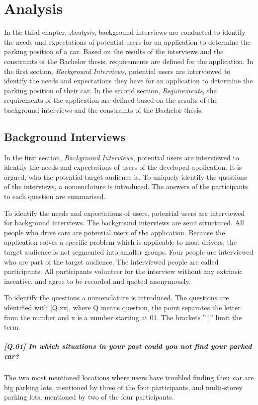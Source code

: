 \chapter{Analysis}
In the third chapter, \textit{Analysis}, background interviews are conducted to identify the needs and expectations of potential users for an application to determine the parking position of a car. Based on the results of the interviews and the constraints of the Bachelor thesis, requirements are defined for the application.
In the first section, \textit{Background Interviews}, potential users are interviewed to identify the needs and expectations they have for an application to determine the parking position of their car.
In the second section, \textit{Requirements}, the requirements of the application are defined based on the results of the background interviews and the constraints of the Bachelor thesis.

\section{Background Interviews}
In the first section, \textit{Background Interviews}, potential users are interviewed to identify the needs and expectations of  users of the developed application. It is argued, who the potential target audience is. To uniquely identify the questions of the interviews, a nomenclature is introduced. The answers of the participants to each question are summarised.

To identify the needs and expectations of users, potential users are interviewed for background interviews. The background interviews are semi structured. All people who drive cars are potential users of the application. Because the application solves a specific problem which is applicable to most drivers, the target audience is not segmented into smaller groups. Four people are interviewed who are part of the target audience. The interviewed people are called participants. All participants volunteer for the interview without any extrinsic incentive, and agree to be recorded and quoted anonymously. \cite{Abras2004} \cite{wilson2013interview}

To identify the questions a nomenclature is introduced. The questions are identified with [Q.xx], where Q means question, the point separates the letter from the number and x is a number starting at 01. The brackets ''[]'' limit the term.

\paragraph{[Q.01] In which situations in your past could you not find your parked car?}
The two most mentioned locations where users have troubled finding their car are big parking lots, mentioned by three of the four participants, and multi-storey parking lots, mentioned by two of the four participants.

